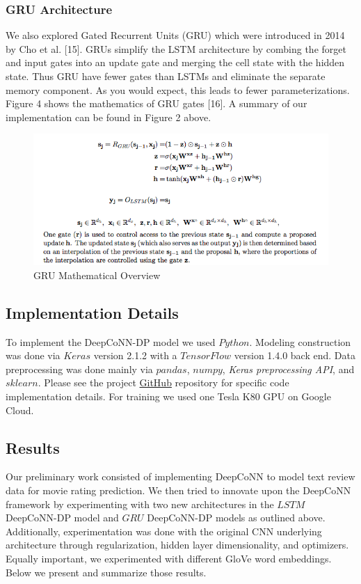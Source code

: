 \documentclass[10pt,twocolumn,letterpaper]{article}
\begin{document}
\subsubsection{GRU Architecture}
We also explored Gated Recurrent Units (GRU) which were introduced in 2014 by Cho et al. [15]. GRUs simplify the LSTM architecture by combing the forget and input gates into an update gate and merging the cell state with the
hidden state. Thus GRU have fewer gates than LSTMs and eliminate the separate memory component. As you would expect, this leads to fewer parameterizations. Figure 4 shows the mathematics of GRU gates [16]. A summary of our implementation can be found in Figure 2 above.

\begin{figure}[!ht]
\includegraphics[scale=0.40]{GRU.png}
\caption{GRU Mathematical Overview}
\end{figure}

\subsection{Implementation Details}

To implement the DeepCoNN-DP model we used $Python$. Modeling construction was done via $Keras$ version 2.1.2 with a $TensorFlow$ version 1.4.0 back end. Data preprocessing was done mainly via $pandas$, $numpy$, \textit{Keras preprocessing API}, and $sklearn$. Please see the project \href{https://github.com/michaelAlvarino/Deep-Learning}{GitHub} repository for specific code implementation details. For training we used one Tesla K80 GPU on Google Cloud.

\subsection{Results}

Our preliminary work consisted of implementing DeepCoNN to model text review data for movie rating prediction. We then tried to innovate upon the DeepCoNN framework by experimenting with two new architectures in the $LSTM$ DeepCoNN-DP model and $GRU$ DeepCoNN-DP models as outlined above. Additionally, experimentation was done with the original CNN underlying architecture through regularization, hidden layer dimensionality, and optimizers. Equally important, we experimented with different GloVe word embeddings. Below we present and summarize those results.
\end{document}
